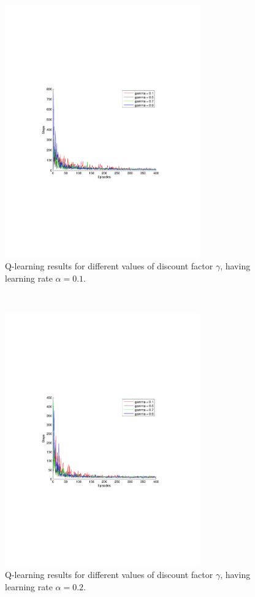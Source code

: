 \documentclass[a4paper,11pt]{article}
\begin{document}
\begin{figure}[h!]
  \centering
    \includegraphics[trim=4cm 8.5cm 4cm 8.5cm,clip,width=0.75\textwidth]{figures/qla01.pdf}
    \caption{Q-learning results for different values of discount factor $\gamma$, having learning rate $\alpha = 0.1$.}
\end{figure}
~
\begin{figure}[h!]
  \centering
    \includegraphics[trim=4cm 8.5cm 4cm 8.5cm,clip,width=0.75\textwidth]{figures/qla02.pdf}
    \caption{Q-learning results for different values of discount factor $\gamma$, having learning rate $\alpha = 0.2$.}
\end{figure}
\end{document}
